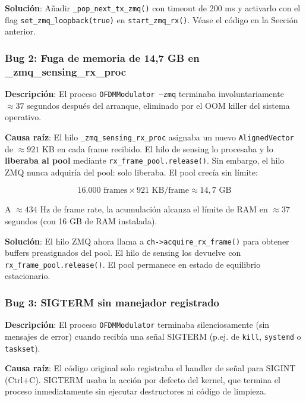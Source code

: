 \documentclass[11pt,a4paper]{article}
\begin{document}
\textbf{Solución}: Añadir \texttt{\_pop\_next\_tx\_zmq()} con timeout de 200 ms y
activarlo con el flag \texttt{set\_zmq\_loopback(true)} en \texttt{start\_zmq\_rx()}.
Véase el código en la Sección anterior.

\subsubsection{Bug 2: Fuga de memoria de 14,7 GB en \_zmq\_sensing\_rx\_proc}

\textbf{Descripción}: El proceso \texttt{OFDMModulator --zmq} terminaba
involuntariamente $\approx 37$ segundos después del arranque, eliminado por el
OOM killer del sistema operativo.

\textbf{Causa raíz}: El hilo \texttt{\_zmq\_sensing\_rx\_proc} asignaba un nuevo
\texttt{AlignedVector} de $\approx 921$ KB en cada frame recibido. El hilo de
sensing lo procesaba y lo \textbf{liberaba al pool} mediante
\texttt{rx\_frame\_pool.release()}. Sin embargo, el hilo ZMQ nunca adquiría del pool:
solo liberaba. El pool crecía sin límite:

\begin{equation}
  16.000 \text{ frames} \times 921 \text{ KB/frame} \approx 14{,}7 \text{ GB}
  \label{eq:mem_leak}
\end{equation}

A $\approx 434$ Hz de frame rate, la acumulación alcanza el límite de RAM en
$\approx 37$ segundos (con 16 GB de RAM instalada).

\textbf{Solución}: El hilo ZMQ ahora llama a \texttt{ch->acquire\_rx\_frame()} para
obtener buffers preasignados del pool. El hilo de sensing los devuelve con
\texttt{rx\_frame\_pool.release()}. El pool permanece en estado de equilibrio estacionario.

\subsubsection{Bug 3: SIGTERM sin manejador registrado}

\textbf{Descripción}: El proceso \texttt{OFDMModulator} terminaba silenciosamente
(sin mensajes de error) cuando recibía una señal SIGTERM (p.ej. de \texttt{kill},
\texttt{systemd} o \texttt{taskset}).

\textbf{Causa raíz}: El código original solo registraba el handler de señal para
SIGINT (Ctrl+C). SIGTERM usaba la acción por defecto del kernel, que termina el
proceso inmediatamente sin ejecutar destructores ni código de limpieza.
\end{document}

